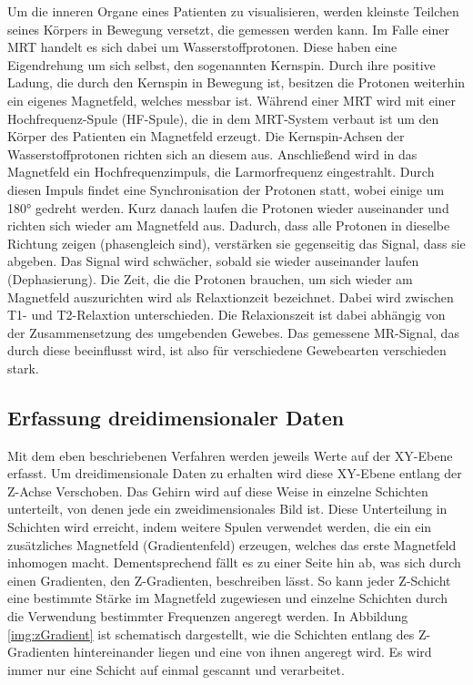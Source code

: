 Um die inneren Organe eines Patienten zu visualisieren, werden kleinste Teilchen seines Körpers in Bewegung versetzt, die gemessen werden kann. Im Falle einer MRT handelt es sich dabei um Wasserstoffprotonen. Diese haben eine Eigendrehung um sich selbst, den sogenannten Kernspin. Durch ihre positive Ladung, die durch den Kernspin in Bewegung ist, besitzen die Protonen weiterhin ein eigenes Magnetfeld, welches messbar ist. 
Während einer MRT wird mit einer Hochfrequenz-Spule (HF-Spule), die in dem MRT-System verbaut ist um den Körper des Patienten ein Magnetfeld erzeugt. Die Kernspin-Achsen der Wasserstoffprotonen richten sich an diesem aus. Anschließend wird in das Magnetfeld ein Hochfrequenzimpuls, die Larmorfrequenz eingestrahlt. Durch diesen Impuls findet eine Synchronisation der Protonen statt, wobei einige um 180° gedreht werden. Kurz danach laufen die Protonen wieder auseinander und richten sich wieder am Magnetfeld aus. 
Dadurch, dass alle Protonen in dieselbe Richtung zeigen (phasengleich sind), verstärken sie gegenseitig das Signal, dass sie abgeben. Das Signal wird schwächer, sobald sie wieder auseinander laufen (Dephasierung).
Die Zeit, die die Protonen brauchen, um sich wieder am Magnetfeld auszurichten wird als Relaxtionzeit bezeichnet. Dabei wird zwischen T1- und T2-Relaxtion unterschieden.
Die Relaxionszeit ist dabei abhängig von der Zusammensetzung des umgebenden Gewebes. Das gemessene MR-Signal, das durch diese beeinflusst wird, ist also für verschiedene Gewebearten verschieden stark.

\subsection{Erfassung dreidimensionaler Daten}

Mit dem eben beschriebenen Verfahren werden jeweils Werte auf der XY-Ebene erfasst. Um dreidimensionale Daten zu erhalten wird diese XY-Ebene entlang der Z-Achse Verschoben. Das Gehirn wird auf diese Weise in einzelne Schichten unterteilt, von denen jede ein zweidimensionales Bild ist.
Diese Unterteilung in Schichten wird erreicht, indem weitere Spulen verwendet werden, die ein ein zusätzliches Magnetfeld (Gradientenfeld) erzeugen, welches das erste Magnetfeld inhomogen macht. Dementsprechend fällt es zu einer Seite hin ab, was sich durch einen Gradienten, den Z-Gradienten, beschreiben lässt. So kann jeder Z-Schicht eine bestimmte Stärke im Magnetfeld zugewiesen und einzelne Schichten durch die Verwendung bestimmter Frequenzen angeregt werden. In Abbildung \ref{img:zGradient} ist schematisch dargestellt, wie die Schichten entlang des Z-Gradienten hintereinander liegen und eine von ihnen angeregt wird.
Es wird immer nur eine Schicht auf einmal gescannt und verarbeitet.

